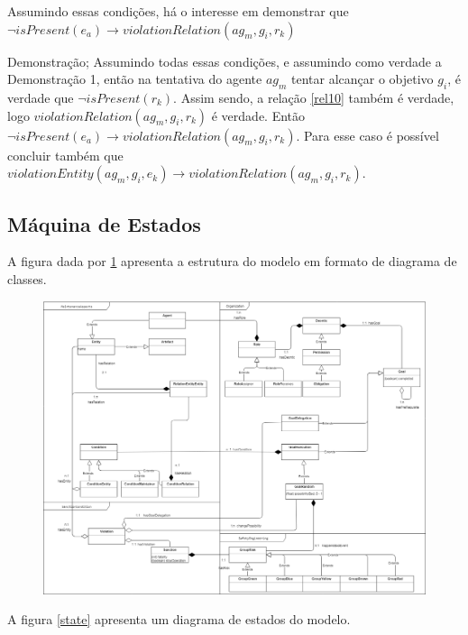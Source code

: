 \documentclass[12pt]{article}
\begin{document}
Assumindo essas condições, há o interesse em demonstrar que $ \neg isPresent(e_a)  \to violationRelation(ag_m,g_i,r_k) $	

Demonstração; 
Assumindo todas essas condições, e assumindo como verdade a Demonstração 1, então na tentativa do agente $ag_m$ tentar alcançar o objetivo $g_i$, é verdade que $\neg isPresent(r_k)$. Assim sendo, a relação \ref{rel10} também é verdade, logo $violationRelation(ag_m,g_i,r_k)$ é verdade. Então $\neg isPresent(e_a) \to violationRelation(ag_m,g_i,r_k)$. Para esse caso é possível concluir também que $violationEntity(ag_m,g_i,e_k) \to violationRelation(ag_m,g_i,r_k)$.

\subsection{Máquina de Estados}

A figura dada por \ref{uml} apresenta a estrutura do modelo em formato de diagrama de classes.

\begin{figure}[H]
  \centering
  \includegraphics[width=0.8\linewidth]{umlmodel} 
  \caption{}
  \label{uml}
\end{figure}

A figura \ref{state} apresenta um diagrama de estados do modelo. 
\end{document}
